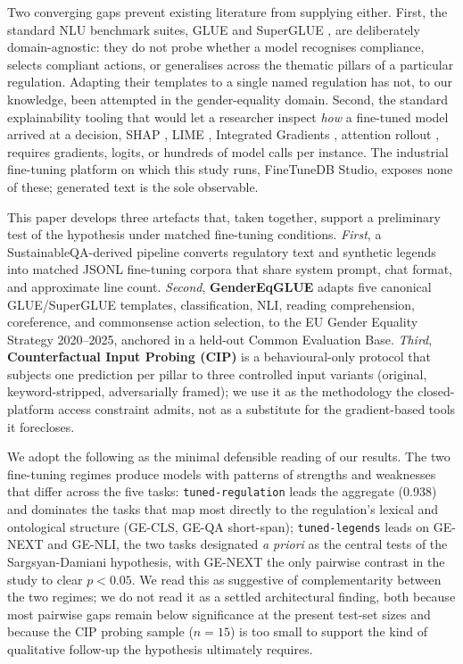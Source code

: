 \documentclass[pdflatex, sn-apa]{sn-jnl}%
\theoremstyle{thmstyleone}%
\theoremstyle{thmstyletwo}%
\theoremstyle{thmstylethree}%
\newcommand{\modellegends}{\texttt{tuned-legends}}
\newcommand{\modelreg}{\texttt{tuned-regulation}}
\begin{document}
Two converging gaps prevent existing literature from supplying either.
First, the standard NLU benchmark suites, GLUE \citep{wang2018glue} and
SuperGLUE \citep{wang2019superglue}, are deliberately domain-agnostic: they
do not probe whether a model recognises compliance, selects compliant
actions, or generalises across the thematic pillars of a particular
regulation. Adapting their templates to a single named regulation has not, to
our knowledge, been attempted in the gender-equality domain. Second, the
standard explainability tooling that would let a researcher inspect
\emph{how} a fine-tuned model arrived at a decision, SHAP
\citep{lundberg2017shap}, LIME \citep{ribeiro2016lime}, Integrated Gradients
\citep{sundararajan2017ig}, attention rollout \citep{abnar2020rollout},
requires gradients, logits, or hundreds of model calls per instance. The
industrial fine-tuning platform on which this study runs, FineTuneDB Studio,
exposes none of these; generated text is the sole observable.

This paper develops three artefacts that, taken together, support a
preliminary test of the hypothesis under matched fine-tuning conditions.
\emph{First}, a SustainableQA-derived
\citep{wattenberg2025sustainableqa} pipeline converts regulatory text and
synthetic legends into matched JSONL fine-tuning corpora that share system
prompt, chat format, and approximate line count. \emph{Second},
\textbf{GenderEqGLUE} adapts five canonical GLUE/SuperGLUE templates,
classification, NLI, reading comprehension, coreference, and commonsense
action selection, to the EU Gender Equality Strategy 2020--2025, anchored in
a held-out Common Evaluation Base. \emph{Third},
\textbf{Counterfactual Input Probing (CIP)} is a behavioural-only protocol
that subjects one prediction per pillar to three controlled input variants
(original, keyword-stripped, adversarially framed); we use it as the
methodology the closed-platform access constraint admits, not as a substitute
for the gradient-based tools it forecloses.

We adopt the following as the minimal defensible reading of our results.
The two fine-tuning regimes produce models with patterns of strengths and
weaknesses that differ across the five tasks: \modelreg{} leads the
aggregate (0.938) and dominates the tasks that map most directly to the
regulation's lexical and ontological structure (GE-CLS, GE-QA short-span);
\modellegends{} leads on GE-NEXT and GE-NLI, the two tasks designated
\emph{a priori} as the central tests of the Sargsyan-Damiani hypothesis,
with GE-NEXT the only pairwise contrast in the study to clear $p<0.05$. We
read this as suggestive of complementarity between the two regimes; we do
not read it as a settled architectural finding, both because most pairwise
gaps remain below significance at the present test-set sizes and because the
CIP probing sample ($n=15$) is too small to support the kind of qualitative
follow-up the hypothesis ultimately requires.
\end{document}
